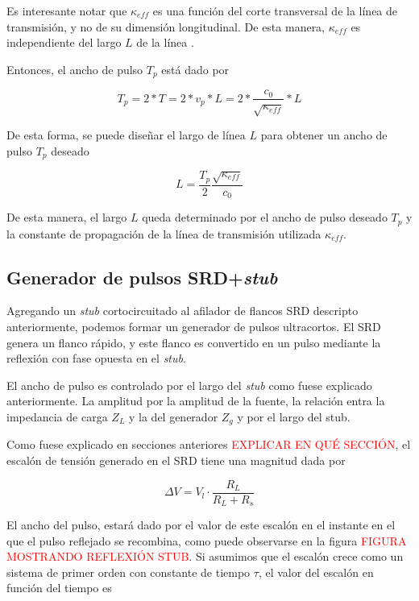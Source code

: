 Es interesante notar que $\kappa_{eff}$ es una función del corte transversal de
la línea de transmisión, y no de su dimensión longitudinal. De esta manera,
$\kappa_{eff}$ es independiente del largo $L$ de la línea \cite{pozar2011}.

Entonces, el ancho de pulso $T_p$ está dado por

\begin{equation}
    T_p = 2*T = 2*v_p*L =2*\frac{c_0}{\sqrt{\kappa_{eff}}}*L
\end{equation}

De esta forma, se puede diseñar el largo de línea $L$ para obtener un ancho de
pulso $T_p$ deseado

\begin{equation}
    L = \frac{T_p}{2}\frac{\sqrt{\kappa_{eff}}}{c_0}
\end{equation}

De esta manera, el largo $L$ queda determinado por el ancho de pulso deseado
$T_p$ y la constante de propagación de la línea de transmisión utilizada
$\kappa_{eff}$.

\subsection{Generador de pulsos SRD+\textit{stub}}

Agregando un \textit{stub} cortocircuitado al afilador de flancos SRD
descripto anteriormente, podemos formar un generador de pulsos ultracortos. El
SRD genera un flanco rápido, y este flanco es convertido en un pulso
mediante la reflexión con fase opuesta en el \textit{stub}. 

El ancho de pulso es controlado por el largo del \textit{stub} como fuese
explicado anteriormente. La amplitud por la amplitud de la fuente, la relación
entra la impedancia de carga $Z_L$ y la del generador $Z_g$ y por el largo del
stub.

Como fuese explicado en secciones anteriores \textcolor{red}{EXPLICAR EN QUÉ
SECCIÓN}, el escalón de tensión generado en el SRD tiene una magnitud dada por

\begin{equation}
    \Delta V = V_l \cdot \frac{R_L}{R_L+R_s}
\end{equation}

El ancho del pulso, estará dado por el valor de este escalón en el instante en
el que el pulso reflejado se recombina, como puede observarse en la figura
\textcolor{red}{FIGURA MOSTRANDO REFLEXIÓN STUB}. Si asumimos que el escalón
crece como un sistema de primer orden con constante de tiempo $\tau$, el valor
del escalón en función del tiempo es

